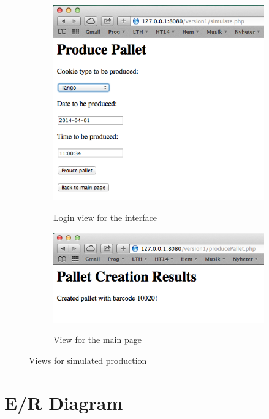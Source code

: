 \documentclass[a4paper]{scrartcl}
\numberwithin{equation}{section}
\begin{document}
\begin{figure}[h!]
  \centering
  	\begin{subfigure}[b]{0.45\textwidth}
    	\includegraphics[width=\textwidth]{figures/view_produce.png}
    	\label{figure:view_produce}
    	\caption{Login view for the interface}
 		\end{subfigure}	
 		\begin{subfigure}[b]{0.45\textwidth}
    	\includegraphics[width=\textwidth]{figures/view_produceResult.png}
    	\label{figure:view_produceResult}
    	\caption{View for the main page}
 		\end{subfigure} 
 		\caption{Views for simulated production}
    \label{figure:viewPR}
\end{figure}

\newpage
\section*{E/R Diagram}
\end{document}
